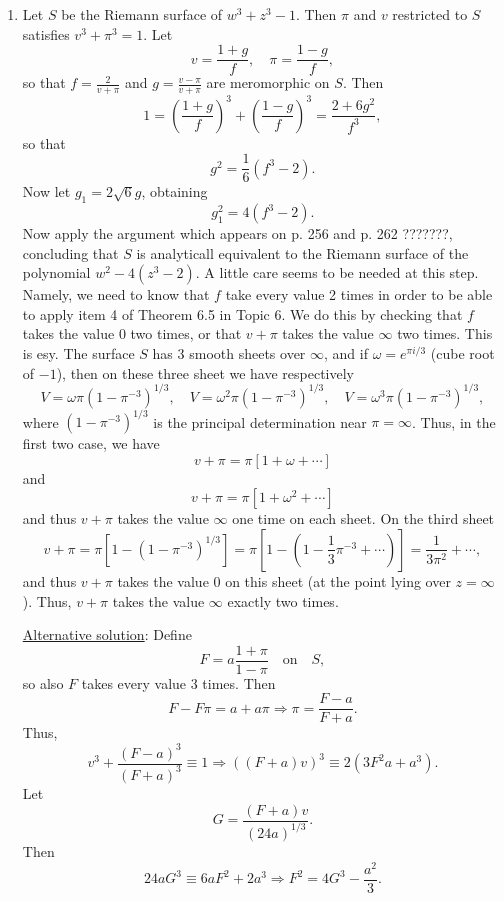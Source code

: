 \documentclass[a4paper,11pt]{article}
\begin{document}
\begin{enumerate}
\item Let $S$ be the Riemann surface of $w^3 + z^3 - 1$.  Then $\pi$
  and $v$ restricted to $S$ satisfies $v^3 + \pi^3 = 1$.  Let
  $$
  v = \frac{1+g}{f},\quad \pi = \frac{1-g}{f},
  $$
  so that $f = \frac{2}{v+\pi}$ and $g = \frac{v-\pi}{v+\pi}$ are
  meromorphic on $S$.  Then
  $$
  1 = (\frac{1+g}{f})^3 + (\frac{1-g}{f})^3 = \frac{2+6g^2}{f^3},
  $$
  so that
  $$
  g^2 = \frac{1}{6}(f^3 - 2).
  $$
  Now let $g_1 = 2\sqrt{6}g$, obtaining
  $$
  g_1^2 = 4(f^3 - 2).
  $$
  Now apply the argument which appears on p. 256 and p. 262 ???????,
  concluding that $S$ is analyticall equivalent to the Riemann surface
  of the polynomial $w^2 - 4(z^3 - 2)$.  A little care seems to be
  needed at this step.  Namely, we need to know that $f$ take every
  value 2 times in order to be able to apply item 4 of Theorem 6.5 in
  Topic 6.  We do this by checking that $f$ takes the value 0 two
  times, or that $v + \pi$ takes the value $\infty$ two times.  This
  is esy.  The surface $S$ has 3 smooth sheets over $\infty$, and if
  $\omega = e^{\pi i/3}$ (cube root of $-1$), then on these three
  sheet we have respectively
  $$
    V = \omega \pi (1 - \pi^{-3})^{1/3},\quad
    V = \omega^2 \pi (1 - \pi^{-3})^{1/3},\quad
    V = \omega^3 \pi (1 - \pi^{-3})^{1/3},
  $$
  where $(1-\pi^{-3})^{1/3}$ is the principal determination near $\pi
  = \infty$.  Thus, in the first two case, we have
  $$
  v + \pi = \pi[1 + \omega + \cdots]
  $$
  and
  $$
  v + \pi = \pi[1 + \omega^2 + \cdots]
  $$
  and thus $v + \pi$ takes the value $\infty$ one time on each sheet.
  On the third sheet
  $$
  v + \pi = \pi[1 - (1-\pi^{-3})^{1/3}]
  = \pi[1 - (1-\frac{1}{3}\pi^{-3} + \cdots)]
  = \frac{1}{3\pi^2} + \cdots,
  $$
  and thus $v + \pi$ takes the value 0 on this sheet (at the point
  lying over $z = \infty$).  Thus, $v + \pi$ takes the value $\infty$
  exactly two times.

  \medskip
  \underline{Alternative solution}:  Define
  $$
  F = a\frac{1+\pi}{1-\pi}\quad\text{on}\quad S,
  $$
  so also $F$ takes every value 3 times.  Then
  $$
  F - F\pi = a + a\pi
  \Rightarrow \pi = \frac{F-a}{F+a}.
  $$
  Thus,
  $$
  v^3 + \frac{(F-a)^3}{(F+a)^3} \equiv 1
  \Rightarrow ((F+a)v)^3 \equiv 2(3F^2a + a^3).
  $$
  Let 
  $$
  G = \frac{(F+a)v}{(24a)^{1/3}}.
  $$
  Then
  $$
  24aG^3 \equiv 6aF^2 + 2a^3
  \Rightarrow F^2 = 4G^3 - \frac{a^2}{3}.
  $$


\end{enumerate}
\end{document}
